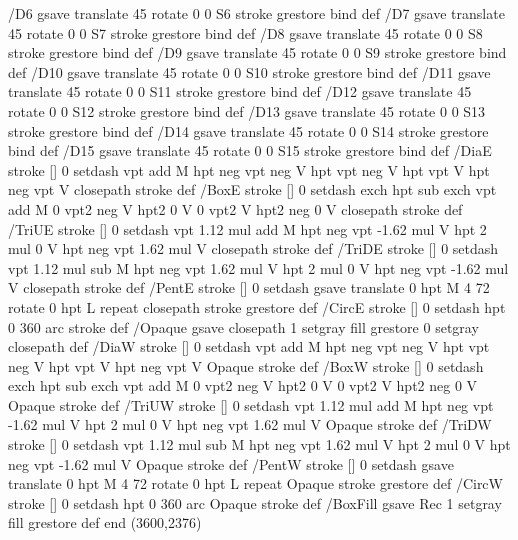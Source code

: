 {/D6 { gsave translate 45 rotate 0 0 S6 stroke grestore } bind def
/D7 { gsave translate 45 rotate 0 0 S7 stroke grestore } bind def
/D8 { gsave translate 45 rotate 0 0 S8 stroke grestore } bind def
/D9 { gsave translate 45 rotate 0 0 S9 stroke grestore } bind def
/D10 { gsave translate 45 rotate 0 0 S10 stroke grestore } bind def
/D11 { gsave translate 45 rotate 0 0 S11 stroke grestore } bind def
/D12 { gsave translate 45 rotate 0 0 S12 stroke grestore } bind def
/D13 { gsave translate 45 rotate 0 0 S13 stroke grestore } bind def
/D14 { gsave translate 45 rotate 0 0 S14 stroke grestore } bind def
/D15 { gsave translate 45 rotate 0 0 S15 stroke grestore } bind def
/DiaE { stroke [] 0 setdash vpt add M
  hpt neg vpt neg V hpt vpt neg V
  hpt vpt V hpt neg vpt V closepath stroke } def
/BoxE { stroke [] 0 setdash exch hpt sub exch vpt add M
  0 vpt2 neg V hpt2 0 V 0 vpt2 V
  hpt2 neg 0 V closepath stroke } def
/TriUE { stroke [] 0 setdash vpt 1.12 mul add M
  hpt neg vpt -1.62 mul V
  hpt 2 mul 0 V
  hpt neg vpt 1.62 mul V closepath stroke } def
/TriDE { stroke [] 0 setdash vpt 1.12 mul sub M
  hpt neg vpt 1.62 mul V
  hpt 2 mul 0 V
  hpt neg vpt -1.62 mul V closepath stroke } def
/PentE { stroke [] 0 setdash gsave
  translate 0 hpt M 4 {72 rotate 0 hpt L} repeat
  closepath stroke grestore } def
/CircE { stroke [] 0 setdash 
  hpt 0 360 arc stroke } def
/Opaque { gsave closepath 1 setgray fill grestore 0 setgray closepath } def
/DiaW { stroke [] 0 setdash vpt add M
  hpt neg vpt neg V hpt vpt neg V
  hpt vpt V hpt neg vpt V Opaque stroke } def
/BoxW { stroke [] 0 setdash exch hpt sub exch vpt add M
  0 vpt2 neg V hpt2 0 V 0 vpt2 V
  hpt2 neg 0 V Opaque stroke } def
/TriUW { stroke [] 0 setdash vpt 1.12 mul add M
  hpt neg vpt -1.62 mul V
  hpt 2 mul 0 V
  hpt neg vpt 1.62 mul V Opaque stroke } def
/TriDW { stroke [] 0 setdash vpt 1.12 mul sub M
  hpt neg vpt 1.62 mul V
  hpt 2 mul 0 V
  hpt neg vpt -1.62 mul V Opaque stroke } def
/PentW { stroke [] 0 setdash gsave
  translate 0 hpt M 4 {72 rotate 0 hpt L} repeat
  Opaque stroke grestore } def
/CircW { stroke [] 0 setdash 
  hpt 0 360 arc Opaque stroke } def
/BoxFill { gsave Rec 1 setgray fill grestore } def
end
}
\GNUPLOTpicture(3600,2376)
